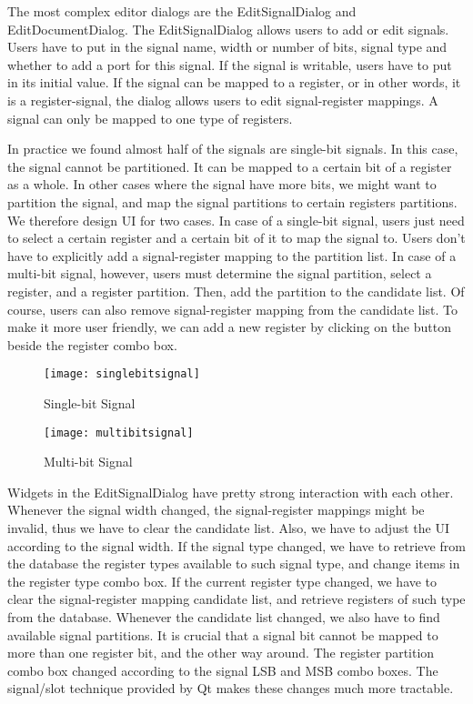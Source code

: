 The most complex editor dialogs are the EditSignalDialog and EditDocumentDialog. The EditSignalDialog allows users to add or edit signals. Users have to put in the signal name, width or number of bits, signal type and whether to add a port for this signal. If the signal is writable, users have to put in its initial value. If the signal can be mapped to a register, or in other words, it is a register-signal, the dialog allows users to edit signal-register mappings. A signal can only be mapped to one type of registers.

In practice we found almost half of the signals are single-bit signals. In this case, the signal cannot be partitioned. It can be mapped to a certain bit of a register as a whole. In other cases where the signal have more bits, we might want to partition the signal, and map the signal partitions to certain registers partitions. We therefore design UI for two cases. In case of a single-bit signal, users just need to select a certain register and a certain bit of it to map the signal to. Users don't have to explicitly add a signal-register mapping to the partition list. In case of a multi-bit signal, however, users must determine the signal partition, select a register, and a register partition. Then, add the partition to the candidate list. Of course, users can also remove signal-register mapping from the candidate list. To make it more user friendly, we can add a new register by clicking on the button beside the register combo box.  

\begin{figure}[htbp]
\centering
\texttt{[image: singlebitsignal]}
\caption{Single-bit Signal\label{fig:Single-bit Signal}}
\end{figure}

\begin{figure}[htbp]
\centering
\texttt{[image: multibitsignal]}
\caption{Multi-bit Signal\label{fig:Multi-bit Signal}}
\end{figure}

Widgets in the EditSignalDialog have pretty strong interaction with each other. Whenever the signal width changed, the signal-register mappings might be invalid, thus we have to clear the candidate list. Also, we have to adjust the UI according to the signal width. If the signal type changed, we have to retrieve from the database the register types available to such signal type, and change items in the register type combo box. If the current register type changed, we have to clear the signal-register mapping candidate list, and retrieve registers of such type from the database. Whenever the candidate list changed, we also have to find available signal partitions. It is crucial that a signal bit cannot be mapped to more than one register bit, and the other way around. The register partition combo box changed according to the signal LSB and MSB combo boxes. The signal/slot technique provided by Qt makes these changes much more tractable.

